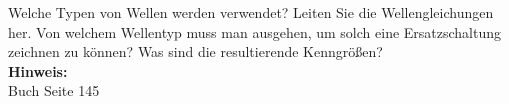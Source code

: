 \begin{question}[section=5,subsection=53,name={Verlustfreie Doppelleitung},difficulty=8,type=mdl,mode=exm,tags={}]
	Welche Typen von Wellen werden verwendet? Leiten Sie die Wellengleichungen her. Von welchem Wellentyp muss man ausgehen, um solch eine Ersatzschaltung zeichnen zu können? Was sind die resultierende Kenngrößen?
	\\ \textbf{Hinweis:}\\
	Buch Seite 145
\end{question}
\begin{solution}
	
\end{solution}